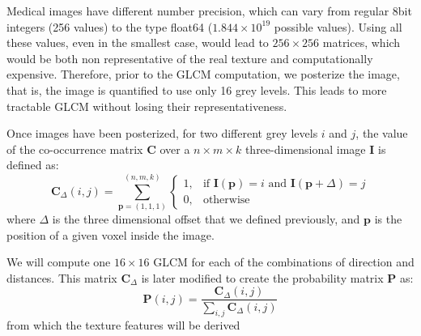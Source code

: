 Medical images have different number precision, which can vary from regular 8bit integers (256 values) to the type float64 ($1.844\times10^{19}$ possible values). Using all these values, even in the smallest case, would lead to $256\times 256$ matrices, which would be both non representative of the real texture and computationally expensive. Therefore, prior to the \ac{GLCM} computation, we posterize the image, that is, the image is quantified to use only 16 grey levels. This leads to more tractable \ac{GLCM} without losing their representativeness. 

Once images have been posterized, for two different grey levels $i$ and $j$, the value of the co-occurrence matrix $\mathbf{C}$ over a $n \times m \times k$ three-dimensional image $\mathbf{I}$ is defined as: 
\begin{equation}\label{eq:cooc3D}
\mathbf{C}_{\Delta}(i,j)=\sum_{\mathbf{p}=(1,1,1)}^{(n,m,k)}\begin{cases} 1, & \mbox{if }\mathbf{I}(\mathbf{p})=i\mbox{ and }\mathbf{I}(\mathbf{p}+\Delta)=j \\ 0, & \mbox{otherwise}\end{cases}
\end{equation}
where $\Delta$ is the three dimensional offset that we defined previously, and $\mathbf{p}$ is the position of a given voxel inside the image. 

We will compute one $16\times16$ \ac{GLCM} for each of the combinations of direction and distances. This matrix $\mathbf{C}_{\Delta}$ is later modified to create the probability matrix $\mathbf{P}$ as: 
\begin{equation}
\mathbf{P}(i,j) = \frac{\mathbf{C}_{\Delta}(i,j)}{\sum_{i,j}\mathbf{C}_{\Delta}(i,j)}
\end{equation}
from which the texture features will be derived

